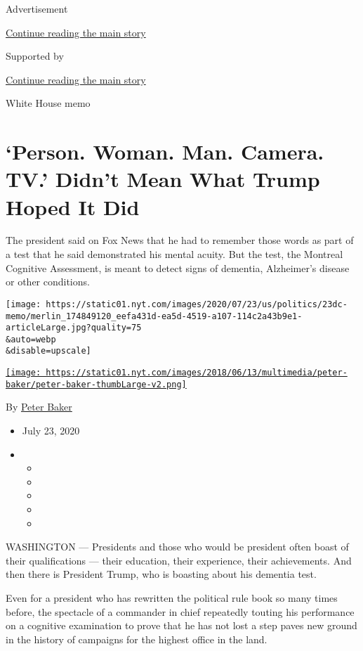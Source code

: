 Advertisement

\protect\hyperlink{after-top}{Continue reading the main story}

Supported by

\protect\hyperlink{after-sponsor}{Continue reading the main story}

White House memo

\hypertarget{person-woman-man-camera-tv-didnt-mean-what-trump-hoped-it-did}{%
\section{`Person. Woman. Man. Camera. TV.' Didn't Mean What Trump Hoped
It
Did}\label{person-woman-man-camera-tv-didnt-mean-what-trump-hoped-it-did}}

The president said on Fox News that he had to remember those words as
part of a test that he said demonstrated his mental acuity. But the
test, the Montreal Cognitive Assessment, is meant to detect signs of
dementia, Alzheimer's disease or other conditions.

\texttt{[image: https://static01.nyt.com/images/2020/07/23/us/politics/23dc-memo/merlin\_174849120\_eefa431d-ea5d-4519-a107-114c2a43b9e1-articleLarge.jpg?quality=75\\\&auto=webp\\\&disable=upscale]}

\href{https://www.nytimes.com/by/peter-baker}{\texttt{[image: https://static01.nyt.com/images/2018/06/13/multimedia/peter-baker/peter-baker-thumbLarge-v2.png]}}

By \href{https://www.nytimes.com/by/peter-baker}{Peter Baker}

\begin{itemize}
\item
  July 23, 2020
\item
  \begin{itemize}
  \item
  \item
  \item
  \item
  \item
  \end{itemize}
\end{itemize}

WASHINGTON --- Presidents and those who would be president often boast
of their qualifications --- their education, their experience, their
achievements. And then there is President Trump, who is boasting about
his dementia test.

Even for a president who has rewritten the political rule book so many
times before, the spectacle of a commander in chief repeatedly touting
his performance on a cognitive examination to prove that he has not lost
a step paves new ground in the history of campaigns for the highest
office in the land.

